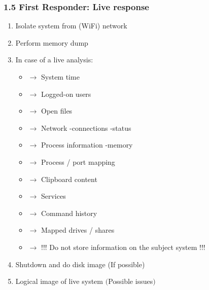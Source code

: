 \begin{frame}
  \frametitle{1.5 First Responder: Live response}
  \begin{enumerate}
	  \item Isolate system from (WiFi) network
      \item Perform memory dump
      \item In case of a live analysis:
      \begin{itemize}
          \item[] $\to$ System time
          \item[] $\to$ Logged-on users
          \item[] $\to$ Open files
          \item[] $\to$ Network -connections -status
          \item[] $\to$ Process information -memory
          \item[] $\to$ Process / port mapping
          \item[] $\to$ Clipboard content
          \item[] $\to$ Services
          \item[] $\to$ Command history
          \item[] $\to$ Mapped drives / shares
          \item[] $\to$ !!! Do not store information on the subject system !!!
      \end{itemize}
      \item Shutdown and do disk image (If possible)
      \item Logical image of live system $($Possible issues$)$
  \end{enumerate}
\end{frame}


